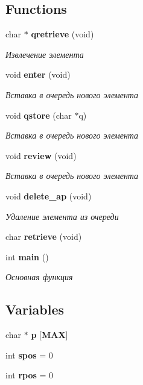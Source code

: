 \subsection*{Functions}
\begin{DoxyCompactItemize}
\item 
char $\ast$ {\bf qretrieve} (void)
\begin{DoxyCompactList}\small\item\em Извлечение элемента \end{DoxyCompactList}\item 
void {\bf enter} (void)
\begin{DoxyCompactList}\small\item\em Вставка в очередь нового элемента \end{DoxyCompactList}\item 
void {\bf qstore} (char $\ast$q)
\begin{DoxyCompactList}\small\item\em Вставка в очередь нового элемента \end{DoxyCompactList}\item 
void {\bf review} (void)
\begin{DoxyCompactList}\small\item\em Вставка в очередь нового элемента \end{DoxyCompactList}\item 
void {\bf delete\-\_\-ap} (void)
\begin{DoxyCompactList}\small\item\em Удаление элемента из очереди \end{DoxyCompactList}\item 
char {\bfseries retrieve} (void)\label{_o4ered_8cpp_ad6179df7031edcad2f714aa1e3bc3e44}

\item 
int {\bf main} ()
\begin{DoxyCompactList}\small\item\em Основная функция \end{DoxyCompactList}\end{DoxyCompactItemize}
\subsection*{Variables}
\begin{DoxyCompactItemize}
\item 
char $\ast$ {\bfseries p} [{\bf M\-A\-X}]\label{_o4ered_8cpp_ab39066f5c1086659cd6210c7bdc3063f}

\item 
int {\bfseries spos} = 0\label{_o4ered_8cpp_a24f340511b1280c042f185eab3c90984}

\item 
int {\bfseries rpos} = 0\label{_o4ered_8cpp_aeb0b0d2597e73f4e7f45b756c2ffd1bb}

\end{DoxyCompactItemize}


